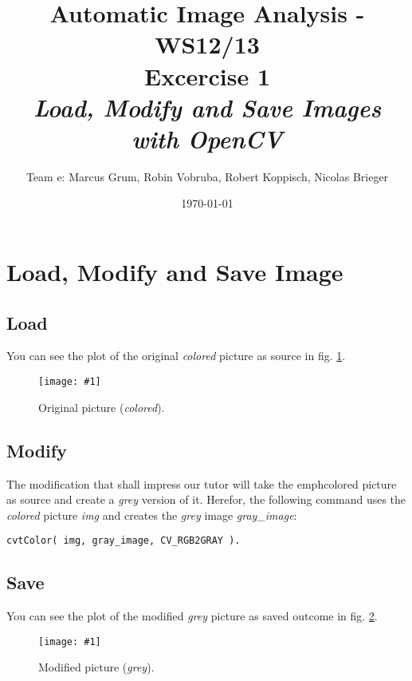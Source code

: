 \documentclass[a4paper,headings=small]{scrartcl}
\title{Automatic Image Analysis - WS12/13 \\ Excercise 1 \\ \emph{Load, Modify and Save Images with OpenCV}}
\author{Team e: Marcus Grum, Robin Vobruba, Robert Koppisch, Nicolas Brieger}
\date{\today}
\numberwithin{equation}{section} %
\numberwithin{figure}{section}   %
\newcommand{\image}[3]{
	\begin{figure}[htbp]
		\centering
		\texttt{[image: \#1]}
		\caption{#3}
		\label{fig:#1}
	\end{figure}
}
\begin{document}
\maketitle



\section{Load, Modify and Save Image}


\subsection{Load}

You can see the plot of the original \emph{colored} picture as source
in fig. \ref{fig:../../../target/Hase_bunt.jpeg}.

\image{../../../target/Hase_bunt.jpeg}{0.5}{%
		Original picture (\emph{colored}).}



\subsection{Modify}

The modification that shall impress our tutor will take the emph{colored} picture as source 
and create a \emph{grey} version of it. Herefor, the following command uses the \emph{colored} 
picture \emph{img} and creates the \emph{grey} image \emph{gray\_image}:
\begin{lstlisting}
cvtColor( img, gray_image, CV_RGB2GRAY ).
\end{lstlisting}

\newpage

\subsection{Save}

You can see the plot of the modified \emph{grey} picture as saved outcome
in fig. \ref{fig:../../../target/result.jpg}.

\image{../../../target/result.jpg}{0.5}{%
		Modified picture (\emph{grey}).}
\end{document}
